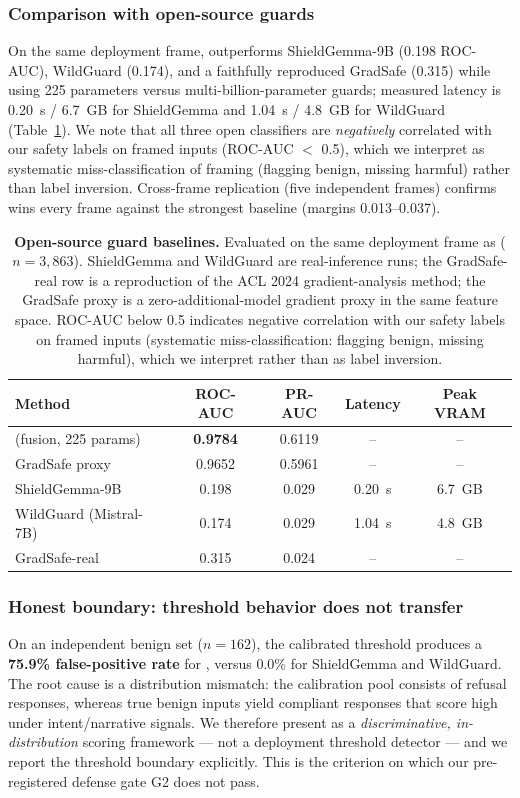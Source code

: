 \subsubsection{Comparison with open-source guards}
On the same deployment frame, \MSRF{} outperforms ShieldGemma-9B (0.198
ROC-AUC), WildGuard (0.174), and a faithfully reproduced GradSafe (0.315) while
using 225 parameters versus multi-billion-parameter guards; measured latency is
0.20~s / 6.7~GB for ShieldGemma and 1.04~s / 4.8~GB for WildGuard
(Table~\ref{tab:baselines}). We note that
all three open classifiers are \emph{negatively} correlated with our safety
labels on framed inputs (ROC-AUC $<$ 0.5), which we interpret as systematic
miss-classification of framing (flagging benign, missing harmful) rather than
label inversion. Cross-frame replication (five independent frames) confirms
\MSRF{} wins every frame against the strongest baseline (margins 0.013--0.037).

\begin{table}[t]
\centering
\caption{\textbf{Open-source guard baselines.} Evaluated on the same deployment
frame as \MSRF{} ($n=3{,}863$). ShieldGemma and WildGuard are real-inference
runs; the GradSafe-real row is a reproduction of the ACL 2024 gradient-analysis
method; the GradSafe proxy is a zero-additional-model gradient proxy in the
same feature space. ROC-AUC below 0.5 indicates negative correlation with our
safety labels on framed inputs (systematic miss-classification: flagging
benign, missing harmful), which we interpret rather than as label inversion.}
\label{tab:baselines}
\footnotesize
\begin{tabular}{lcccc}
\toprule
Method & ROC-AUC & PR-AUC & Latency & Peak VRAM \\
\midrule
\MSRF{} (fusion, 225 params) & \textbf{0.9784} & 0.6119 & -- & -- \\
GradSafe proxy & 0.9652 & 0.5961 & -- & -- \\
ShieldGemma-9B & 0.198 & 0.029 & 0.20~s & 6.7~GB \\
WildGuard (Mistral-7B) & 0.174 & 0.029 & 1.04~s & 4.8~GB \\
GradSafe-real & 0.315 & 0.024 & -- & -- \\
\bottomrule
\end{tabular}
\end{table}

\subsubsection{Honest boundary: threshold behavior does not transfer}
\label{sec:fusion-boundary}
On an independent benign set ($n=162$), the calibrated threshold produces a
\textbf{75.9\% false-positive rate} for \MSRF{}, versus 0.0\% for ShieldGemma
and WildGuard. The root cause is a distribution mismatch: the calibration pool
consists of refusal responses, whereas true benign inputs yield compliant
responses that score high under intent/narrative signals. We therefore present
\MSRF{} as a \emph{discriminative, in-distribution} scoring framework --- not a
deployment threshold detector --- and we report the threshold boundary
explicitly. This is the criterion on which our pre-registered defense gate G2
does not pass.

